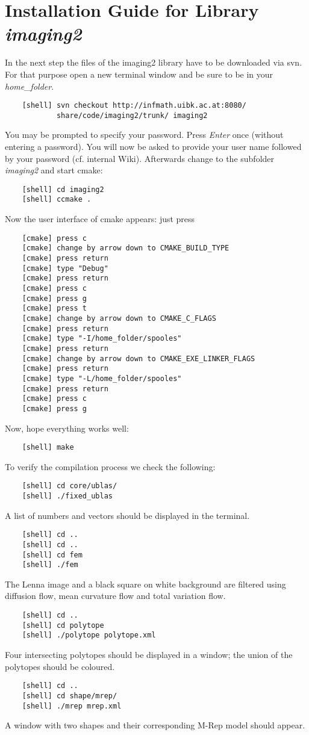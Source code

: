\documentclass[a4paper,10pt]{article}
\begin{document}
\section{Installation Guide for Library \emph{imaging2}}
In the next step the files of the imaging2 library have to be downloaded via svn. For that purpose open a new terminal window
and be sure to be in your \emph{home\_folder}.
\begin{verbatim}
    [shell] svn checkout http://infmath.uibk.ac.at:8080/
            share/code/imaging2/trunk/ imaging2
\end{verbatim}
You may be prompted to specify your password.
Press \emph{Enter} once (without entering a password).
You will now be asked to provide your user name followed by your password (cf. internal Wiki).
Afterwards change to the subfolder \emph{imaging2} and start cmake:
\begin{verbatim}
    [shell] cd imaging2
    [shell] ccmake .
\end{verbatim}
Now the user interface of cmake appears: just press
\begin{verbatim}
    [cmake] press c
    [cmake] change by arrow down to CMAKE_BUILD_TYPE
    [cmake] press return
    [cmake] type "Debug"
    [cmake] press return
    [cmake] press c
    [cmake] press g
    [cmake] press t
    [cmake] change by arrow down to CMAKE_C_FLAGS
    [cmake] press return
    [cmake] type "-I/home_folder/spooles"
    [cmake] press return
    [cmake] change by arrow down to CMAKE_EXE_LINKER_FLAGS
    [cmake] press return
    [cmake] type "-L/home_folder/spooles"
    [cmake] press return
    [cmake] press c
    [cmake] press g
\end{verbatim}
Now, hope everything works well:
\begin{verbatim}
    [shell] make
\end{verbatim}
To verify the compilation process we check the following:
\begin{verbatim}
    [shell] cd core/ublas/
    [shell] ./fixed_ublas
\end{verbatim}
A list of numbers and vectors should be displayed in the terminal.
\begin{verbatim}
    [shell] cd ..
    [shell] cd ..
    [shell] cd fem
    [shell] ./fem
\end{verbatim}
The Lenna image and a black square on white background are filtered using diffusion flow, mean curvature flow and total variation flow.
\begin{verbatim}
    [shell] cd ..
    [shell] cd polytope
    [shell] ./polytope polytope.xml
\end{verbatim}
Four intersecting polytopes should be displayed in a window; the union of the polytopes should be coloured.
\begin{verbatim}
    [shell] cd ..
    [shell] cd shape/mrep/
    [shell] ./mrep mrep.xml
\end{verbatim}
A window with two shapes and their corresponding M-Rep model should appear.
\end{document}
